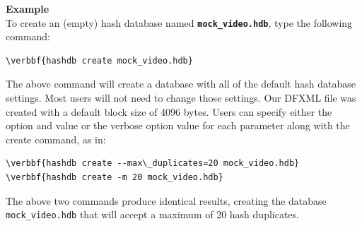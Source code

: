 \documentclass[11pt,fleqn]{article} %
\begin{document}
\textbf{Example}\\
To create an (empty) hash database named \textbf{\texttt{mock\_video.hdb}}, type the following command:
\begin{Verbatim}[commandchars=\\\{\}]
\verbbf{hashdb create mock_video.hdb}
\end{Verbatim}
The above command will create a database with all of the default hash database settings. Most users will not need to change those settings. Our DFXML file was created with a default block size of 4096 bytes.
Users can specify either the option and value or the verbose option value for each parameter along with the create command, as in:\\
\begin{Verbatim}[commandchars=\\\{\}]
\verbbf{hashdb create --max\_duplicates=20 mock_video.hdb}
\verbbf{hashdb create -m 20 mock_video.hdb}
\end{Verbatim}
The above two commands produce identical results, creating the database \texttt{mock\_video.hdb} that will accept a maximum of 20 hash duplicates.\\
\end{document}
